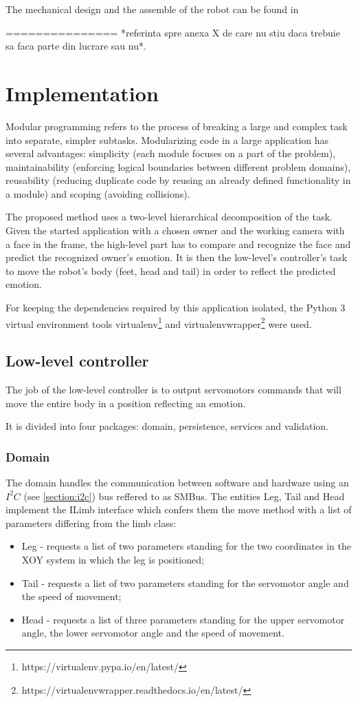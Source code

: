 \documentclass[runningheads,a4paper,12pt]{report}
\begin{document}
The mechanical design and the assemble of the robot can be found in 

=============== *referinta spre anexa X de care nu stiu daca trebuie sa faca parte din lucrare sau nu*.

\section{Implementation}
\label{chapter:implementation}

Modular programming refers to the process of breaking a large and complex task into separate, simpler subtasks. Modularizing code in a large application has several advantages: simplicity (each module focuses on a part of the problem), maintainability (enforcing logical boundaries between different problem domains), reusability (reducing duplicate code by reusing an already defined functionality in a module) and scoping (avoiding collisions). 

The proposed method uses a two-level hierarchical decomposition of the task. Given the started application with a chosen owner and the working camera with a face in the frame, the high-level part has to compare and recognize the face and predict the recognized owner's emotion. It is then the low-level's controller's task to move the robot's body (feet, head and tail) in order to reflect the predicted emotion. 

For keeping the dependencies required by this application isolated, the Python 3 virtual environment tools virtualenv\footnote{https://virtualenv.pypa.io/en/latest/} and virtualenvwrapper\footnote{https://virtualenvwrapper.readthedocs.io/en/latest/} were used. 

\subsection*{Low-level controller}
The job of the low-level controller is to output servomotors commands that will move the entire body in a position reflecting an emotion.

It is divided into four packages: domain, persistence, services and validation. 

\subsubsection{Domain}
The domain handles the communication between software and hardware using an $I^2C$ (see \ref{section:i2c}) bus reffered to as SMBus. The entities Leg, Tail and Head implement the ILimb interface which confers them the move method with a list of parameters differing from the limb class:
\begin{itemize}
\item Leg - requests a list of two parameters standing for the two coordinates in the XOY system in which the leg is positioned;
\item Tail - requests a list of two parameters standing for the servomotor angle and the speed of movement;
\item Head - requests a list of three parameters standing for the upper servomotor angle, the lower servomotor angle and the speed of movement.
\end{itemize}
\end{document}
